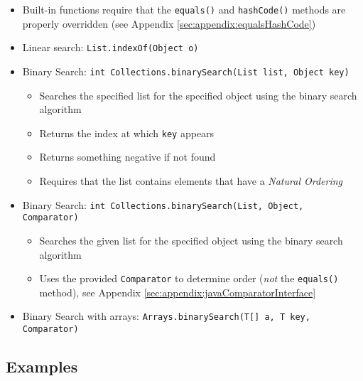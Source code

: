 \begin{itemize}
  \item Built-in functions require that the \texttt{equals()} 
    and \texttt{hashCode()} methods are properly overridden 
    (see Appendix \ref{sec:appendix:equalsHashCode})
  \item Linear search: \texttt{List.indexOf(Object o)}
  \item Binary Search: \texttt{int Collections.binarySearch(List list, Object key)}
    \begin{itemize}
      \item Searches the specified list for the specified object using the binary search algorithm
      \item Returns the index at which \texttt{key} appears
      \item Returns something negative if not found
      \item Requires that the list contains elements that have a \emph{Natural Ordering}
     \end{itemize}
  \item Binary Search: \texttt{int Collections.binarySearch(List, Object, Comparator)}
    \begin{itemize}
      \item Searches the given list for the specified object using the binary search algorithm
      \item Uses the provided \texttt{Comparator} to determine 
      order (\emph{not} the \texttt{equals()} method), see 
      Appendix \ref{sec:appendix:javaComparatorInterface}
     \end{itemize}
  \item Binary Search with arrays: \texttt{Arrays.binarySearch(T[] a, T key, Comparator)}
\end{itemize}

\subsection{Examples}


